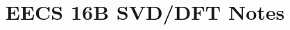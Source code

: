\documentclass{../content16b}
\begin{document}
\title{EECS 16B SVD/DFT Notes}
\renewcommand{\printchaptername}{\chapnamefont Lecture}












\end{document}
